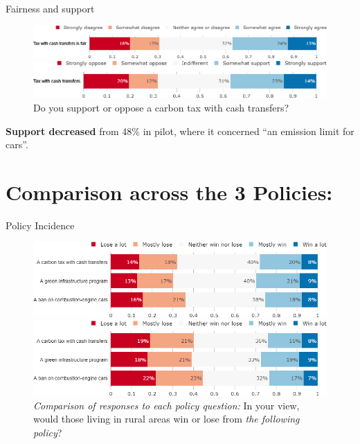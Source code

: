 \documentclass[aspectratio=169,9pt,dvipsnames]{beamer}
\begin{document}
\begin{frame}{Fairness and support}%
\begin{figure}[h!]
\centering
\caption{Do you agree or disagree with the following statement: ``A carbon tax with cash transfers is fair."}
\includegraphics[width=\textwidth]{../figures/US/tax_transfers_fair_US.png}
\vspace{.5cm}
\centering
\caption{Do you support or oppose a carbon tax with cash transfers?}
\includegraphics[width=\textwidth]{../figures/US/tax_transfers_support_US.png}
\end{figure}

\textbf{Support decreased} from 48\% in pilot, where it concerned ``an emission limit for cars''.
\end{frame}

\section{Comparison across the 3 Policies:}

\begin{frame}{Policy Incidence}%
\begin{figure}[h!]
\centering
\caption{\textit{Comparison of responses to each policy question:} Do you think that financially your household would win or lose from \textit{the policy}?}
\includegraphics[width=.7\textwidth]{../figures/US/policies_win_lose_self_US.png}
\vspace{-.1cm}
\centering
\caption{\textit{Comparison of responses to each policy question:} In your view, would those living in rural areas win or lose from \textit{the following policy}?}
\includegraphics[width=.7\textwidth]{../figures/US/policies_win_lose_rural_US.png}
\end{figure}
\end{frame}
\end{document}
